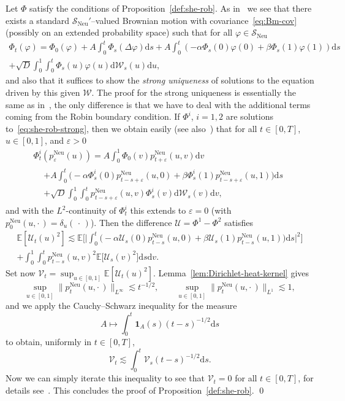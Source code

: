 \documentclass[10pt]{amsart}
\theoremstyle{definition}\newtheorem{defi}[theo]{Definition}\newtheorem{rema}[theo]{Remark}\newtheorem{exam}[theo]{Example}\newtheorem{exem}[theo]{Example}\newtheorem{nota}[theo]{Notation}
\DeclareMathOperator{\Neu}{Neu}
\newcommand{\bb}[1]{{\mathbb #1}}
\newcommand{\mc}[1]{{\mathcal #1}}
\renewcommand{\mc}[1]{{\mathcal #1}}
\newcommand{\mb}[1]{{\mathbf #1}}
\newcommand{\SN}{\ensuremath{\mc S_{\Neu}}}
\newcommand*{\dd}{\mathrm{d}}
\newcommand*{\ds}{\dd s}
\newcommand*{\du}{\dd u}
\newcommand*{\dv}{\dd v}
\begin{document}
Let $\Phi$ satisfy the conditions of Proposition~\ref{def:she-rob}. As in~\cite[Chapter~5]{BerG} we see that there exists a standard $\SN'$--valued Brownian motion with covariance~\eqref{eq:Bm-cov} (possibly on an extended probability space) such that for all $\varphi \in \SN$
\begin{multline}
\Phi_t(\varphi) = \Phi_0(\varphi) + A \int_0^t \Phi_s(\Delta \varphi) \ds + A \int_0^t (- \alpha \Phi_s(0) \varphi(0)+ \beta \Phi_s(1) \varphi(1)) \ds\\
+ \sqrt{D} \int_0^1 \int_0^t \Phi_s(u) \varphi(u) \dd\mc W_s(u) \du,\label{eq:she-rob-strong}
\end{multline}
and also that it suffices to show the \emph{strong uniqueness} of solutions to the equation driven by this given $\mc W$. The proof for the strong uniqueness is essentially the same as in~\cite[Theorem~3.2]{Walsh1986}, the only difference is that we have to deal with the additional terms coming from the Robin boundary condition. If $\Phi^i$, $i=1,2$ are solutions to~\eqref{eq:she-rob-strong}, then we obtain easily (see also~\cite[Exercise~3.1]{Walsh1986}) that for all $t \in [0,T]$, $u\in [0,1]$, and $\varepsilon > 0$
\begin{multline*}
\Phi_t^i(p^{\Neu}_\varepsilon(u)) = A \int_0^1 \Phi_0(v) p^{\Neu}_{t+\varepsilon}(u,v)\dv \\
\begin{aligned}
& + A \int_0^t \big(- \alpha \Phi^i_s(0) p_{t-s+\varepsilon}^{\Neu}(u,0)+ \beta \Phi^i_s(1) p_{t-s+\varepsilon}^{\Neu}(u,1)\big) \ds \\
& + \sqrt{D} \int_0^1 \int_0^t p^{\Neu}_{t-s+\varepsilon}(u,v) \Phi^i_s(v) \dd\mc W_s(v) \dv,
\end{aligned}
\end{multline*}
and with the $L^2$-continuity of $\Phi^i_t$ this extends to $\varepsilon = 0$ (with $p^{\Neu}_0(u,\cdot\,) = \delta_u({\,\cdot\,})$). Then the difference $\mc U = \Phi^1 - \Phi^2$ satisfies
\begin{multline*}
\bb E[\mc U_t(u)^2] \lesssim \bb E\Big[\Big|\int_0^t \big(- \alpha \mc U_s(0) p_{t-s}^{\Neu}(u,0)+ \beta \mc U_s(1) p_{t-s}^{\Neu}(u,1)\big) \ds \Big|^2 \Big] \\
+ \int_0^1 \int_0^t p^{\Neu}_{t-s}(u,v)^2 \bb E\big[\mc U_s(v)^2\big] \ds \dv.
\end{multline*}
Set now $\mc V_t = \sup_{u \in [0,1]} \bb E[\mc U_t(u)^2]$. Lemma~\ref{lem:Dirichlet-heat-kernel} gives
\[
\sup_{u \in [0,1]} \big\| p^{\Neu}_t(u,\cdot\,)\big\|_{L^\infty} \lesssim t^{-1/2},\qquad \sup_{u \in [0,1]} \big\| p^{\Neu}_t(u,\cdot\,)\big\|_{L^1} \lesssim 1,
\]
and we apply the Cauchy--Schwarz inequality for the measure
\[
A \mapsto \int_0^t \mb 1_A(s) (t- s)^{-1/2} \ds
\]
to obtain, uniformly in $t \in [0,T]$,
\[
\mc V_t \lesssim \int_0^t \mc V_s (t-s)^{-1/2} \ds.
\]
Now we can simply iterate this inequality to see that $\mc V_t = 0$ for all $t \in [0,T]$, for details see~\cite[Theorem~3.2]{Walsh1986}. This concludes the proof of Proposition~\ref{def:she-rob}. \qed
\medskip
\end{document}

